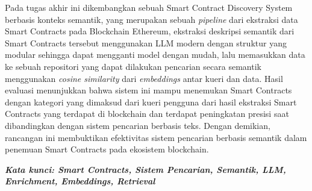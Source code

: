 \begin{singlespace}
	Pada tugas akhir ini dikembangkan sebuah Smart Contract Discovery System berbasis konteks semantik, yang merupakan sebuah \textit{pipeline} dari ekstraksi data Smart Contracts pada Blockchain Ethereum, ekstraksi deskripsi semantik dari Smart Contracts tersebut menggunakan LLM modern dengan struktur yang modular sehingga dapat mengganti model dengan mudah, lalu memasukkan data ke sebuah repositori yang dapat dilakukan pencarian secara semantik menggunakan \textit{cosine similarity} dari \textit{embeddings} antar kueri dan data. Hasil evaluasi menunjukkan bahwa sistem ini mampu menemukan Smart Contracts dengan kategori yang dimaksud dari kueri pengguna dari hasil ekstraksi Smart Contracts yang terdapat di blockchain dan terdapat peningkatan presisi saat dibandingkan dengan sistem pencarian berbasis teks. Dengan demikian, rancangan ini membuktikan efektivitas sistem pencarian berbasis semantik dalam penemuan Smart Contracts pada ekosistem blockchain.

	\textbf{\textit{Kata kunci: Smart Contracts, Sistem Pencarian, Semantik, LLM, Enrichment, Embeddings, Retrieval}}

\end{singlespace}
\clearpage